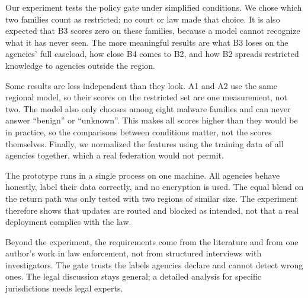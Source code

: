 Our experiment tests the policy gate under simplified conditions. We chose which two families count as restricted; no court or law made that choice. It is also expected that B3 scores zero on these families, because a model cannot recognize what it has never seen. The more meaningful results are what B3 loses on the agencies' full caseload, how close B4 comes to B2, and how B2 spreads restricted knowledge to agencies outside the region.

Some results are less independent than they look. A1 and A2 use the same regional model, so their scores on the restricted set are one measurement, not two. The model also only chooses among eight malware families and can never answer ``benign'' or ``unknown''. This makes all scores higher than they would be in practice, so the comparisons between conditions matter, not the scores themselves. Finally, we normalized the features using the training data of all agencies together, which a real federation would not permit.

The prototype runs in a single process on one machine. All agencies behave honestly, label their data correctly, and no encryption is used. The equal blend on the return path was only tested with two regions of similar size. The experiment therefore shows that updates are routed and blocked as intended, not that a real deployment complies with the law.

Beyond the experiment, the requirements come from the literature and from  one author's work in law enforcement, not from structured interviews with investigators. The gate trusts the labels agencies declare and cannot detect wrong ones. The legal discussion stays general; a detailed analysis for specific jurisdictions needs legal experts.
